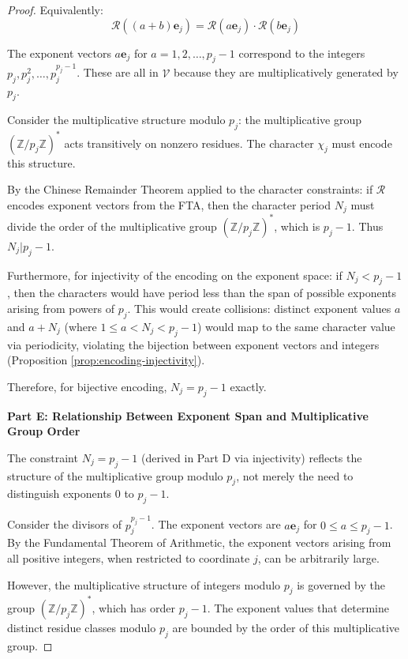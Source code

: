 \begin{proof}
Equivalently:
\begin{equation}
\mathcal{R}((a+b) \mathbf{e}_j) = \mathcal{R}(a \mathbf{e}_j) \cdot \mathcal{R}(b \mathbf{e}_j)
\end{equation}

The exponent vectors $a \mathbf{e}_j$ for $a = 1, 2, \ldots, p_j - 1$ correspond to the integers $p_j, p_j^2, \ldots, p_j^{p_j - 1}$. These are all in $\mathcal{V}$ because they are multiplicatively generated by $p_j$.

Consider the multiplicative structure modulo $p_j$: the multiplicative group $(\mathbb{Z}/p_j\mathbb{Z})^*$ acts transitively on nonzero residues. The character $\chi_j$ must encode this structure.

By the Chinese Remainder Theorem applied to the character constraints: if $\mathcal{R}$ encodes exponent vectors from the FTA, then the character period $N_j$ must divide the order of the multiplicative group $(\mathbb{Z}/p_j\mathbb{Z})^*$, which is $p_j - 1$. Thus $N_j | p_j - 1$.

Furthermore, for injectivity of the encoding on the exponent space: if $N_j < p_j - 1$, then the characters would have period less than the span of possible exponents arising from powers of $p_j$. This would create collisions: distinct exponent values $a$ and $a + N_j$ (where $1 \le a < N_j < p_j - 1$) would map to the same character value via periodicity, violating the bijection between exponent vectors and integers (Proposition \ref{prop:encoding-injectivity}).

Therefore, for bijective encoding, $N_j = p_j - 1$ exactly.

\noindent \textbf{Part E: Relationship Between Exponent Span and Multiplicative Group Order}

The constraint $N_j = p_j - 1$ (derived in Part D via injectivity) reflects the structure of the multiplicative group modulo $p_j$, not merely the need to distinguish exponents 0 to $p_j - 1$.

Consider the divisors of $p_j^{p_j - 1}$. The exponent vectors are $a \mathbf{e}_j$ for $0 \le a \le p_j - 1$. By the Fundamental Theorem of Arithmetic, the exponent vectors arising from all positive integers, when restricted to coordinate $j$, can be arbitrarily large.

However, the multiplicative structure of integers modulo $p_j$ is governed by the group $(\mathbb{Z}/p_j\mathbb{Z})^*$, which has order $p_j - 1$. The exponent values that determine distinct residue classes modulo $p_j$ are bounded by the order of this multiplicative group.


\end{proof}

